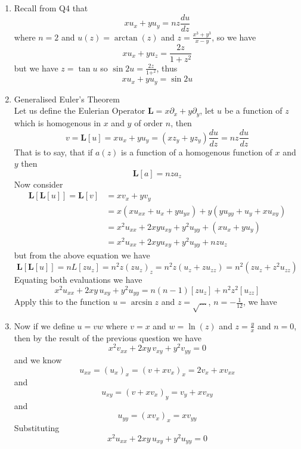 \documentclass[12pt]{article}
\begin{document}
\begin{enumerate}
\item
Recall from Q4 that
$$
xu_{x} + yu_{y} = nz \frac{du}{dz}
$$
where $n=2$ and $u(z) = \arctan(z)$ and $z=\frac{x^{3} + y^{3}}{x-y}$, so we have
$$
xu_{x} + yu_{z} = \frac{2z}{1 + z^{2}} 
$$
but we have $z= \tan u$ so $\sin 2u = \frac{2z}{1 + ^{2}}$, thus
$$
xu_{x} + yu_{y} = \sin 2u
$$

\item Generalised Euler's Theorem \\
Let us define the Eulerian Operator $\mathbf{L} = x\partial_{x} + y\partial_{y}$, let $u$ be a function of $z$ which is homogenous in $x$ and $y$ of order $n$, then
$$
v = \mathbf{L}[u] = xu_{x} + yu_{y} = (xz_{y} + yz_{y}) \frac{du}{dz} = n z \frac{du}{dz} 
$$
That is to say, that if $a(z)$ is a function of a homogenous function of $x$ and $y$ then
$$
\boxed{
\mathbf{L}[a] = nza_{z}
}
$$
Now consider 
$$
\begin{aligned}
\mathbf{L}[\mathbf{L}[u]] = 
\mathbf{L} [v] &= xv_{x} + yv_{y} \\
&= x(xu_{xx} + u_{x} + yu_{yx}) + y(yu_{yy} + u_{y}+xu_{xy})  \\
&=x^{2}u_{x x} + 2xy u_{xy} + y^{2} u_{yy} + (xu_{x}+ yu_{y}) \\
&=x^{2}u_{x x} + 2xy u_{xy} + y^{2} u_{yy} + nzu_{z}
\end{aligned}
$$
but from the above equation we have
$$
\mathbf{L}[\mathbf{L}[u]] = nL[z u_{z}] = n^{2}z(zu_{z})_{z} = n^{2}z(u_{z} + zu_{zz}) = n^{2}(zu_{z } + z^{2}u_{zz})
$$
Equating both evaluations we have
$$
x^{2}u_{xx} + 2xy\, u_{xy} + y^{2} u_{yy} = n(n-1)\left[ zu_{z} \right] + n^{2}z^{2} \left[ u_{zz} \right]
$$
Apply this to the function $u = \arcsin z$ and $z = \sqrt{ \dots }$, $n = -\frac{1}{12}$, we have

\item
Now if we define $u = vw$ where $v=x$ and $w =\ln(z)$ and $z = \frac{y}{x}$ and $n=0$, then by the result of the previous question we have
$$
x^{2}v_{x x} + 2xy \, v_{xy} + y^{2} v_{yy} = 0
$$
and we know
$$
u_{xx} = (u_{x})_{x} = (v + xv_{x})_{x} = 2v_{x} + x v_{xx}
$$
and
$$
u_{xy} = (v + xv_{x})_{y} = v_{y} + xv_{xy}
$$
and 
$$
u_{yy} = (xv_{x})_{x} = xv_{y y }
$$
Substituting
$$
\boxed{
x^{2}u_{xx} + 2xy \, u_{xy} + y^{2} u_{yy} = 0
}
$$


\end{enumerate}
\end{document}
